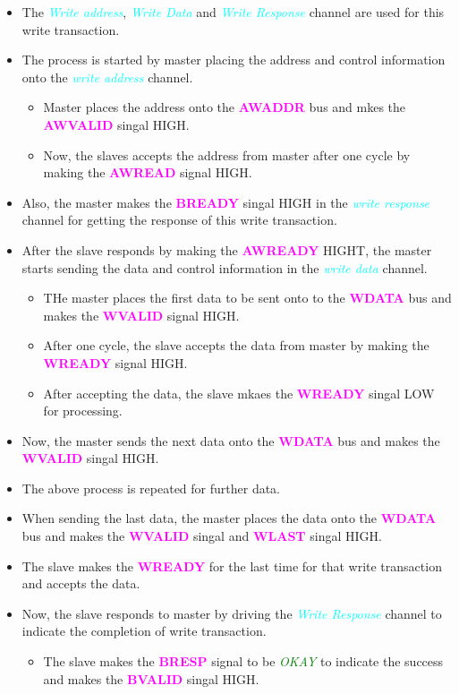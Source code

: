 \documentclass{article}
\newcommand{\chFormat}[1]{\emph{\textcolor{cyan}{#1}}}
\newcommand{\AXISignals}[1]{\textbf{\textcolor{magenta}{#1}}}
\begin{document}
\begin{itemize}
    \item The \chFormat{Write address}, \chFormat{Write Data} and \chFormat{Write Response} channel are used for this write transaction.
    \item The process is started by master placing the address and control information onto the \chFormat{write address} channel.
          \begin{itemize}
              \item Master places the address onto the \AXISignals{AWADDR} bus and mkes the \AXISignals{AWVALID} singal HIGH.
              \item Now, the slaves accepts the address from master after one cycle by making the \AXISignals{AWREAD} signal HIGH.
          \end{itemize}
    \item Also, the master makes the \AXISignals{BREADY} singal HIGH in the \chFormat{write response} channel for getting the response of this write transaction.
    \item After the slave responds by making the \AXISignals{AWREADY} HIGHT, the master starts sending the data and control information in the \chFormat{write data} channel.
          \begin{itemize}
              \item THe master places the first data to be sent onto to the \AXISignals{WDATA} bus and makes the \AXISignals{WVALID} signal HIGH.
              \item After one cycle, the slave accepts the data from master by making the \AXISignals{WREADY} signal HIGH.
              \item After accepting the data, the slave mkaes the \AXISignals{WREADY} singal LOW for processing.
          \end{itemize}
    \item Now, the master sends the next data onto the \AXISignals{WDATA} bus and makes the \AXISignals{WVALID} singal HIGH.
    \item The above process is repeated for further data.
    \item When sending the last data, the master places the data onto the \AXISignals{WDATA} bus and makes the \AXISignals{WVALID} singal and \AXISignals{WLAST} singal HIGH.
    \item The slave makes the \AXISignals{WREADY} for the last time for that write transaction and accepts the data.
    \item Now, the slave responds to master by driving the \chFormat{Write Response} channel to indicate the completion of write transaction.
          \begin{itemize}
              \item The slave makes the \AXISignals{BRESP} signal to be \emph{\textcolor{green}{OKAY}} to indicate the success and makes the \AXISignals{BVALID} singal HIGH.
          \end{itemize}
\end{itemize}
\end{document}
